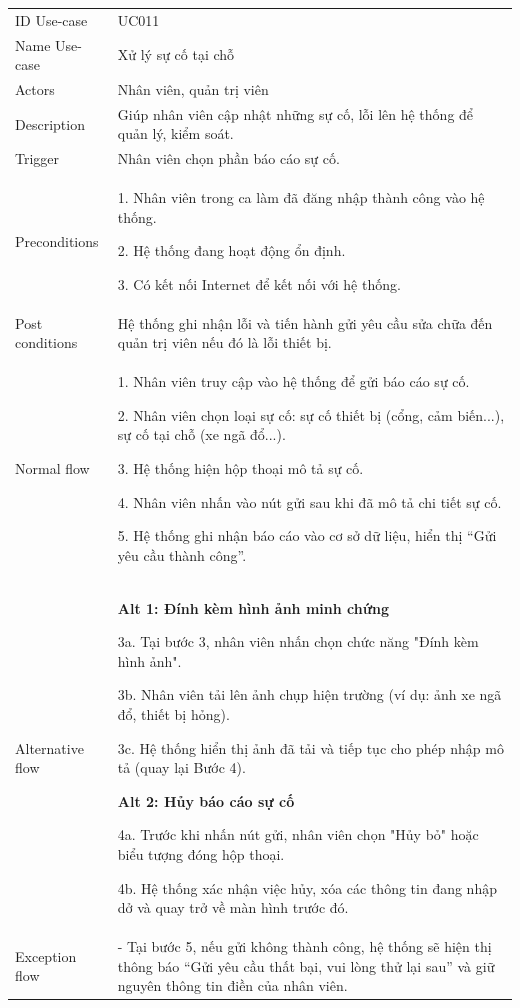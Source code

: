 \begin{center}
    \begin{tabular}{|m{2.5cm}|m{13cm}|}
    \hline
        ID Use-case  & UC011 \\ 
        Name Use-case & Xử lý sự cố tại chỗ \\ 
    \hline
        Actors & Nhân viên, quản trị viên \\
    \hline
        Description & Giúp nhân viên cập nhật những sự cố, lỗi lên hệ thống để quản lý, kiểm soát. \\
    \hline
        Trigger & Nhân viên chọn phần báo cáo sự cố. \\
    \hline
        Preconditions & 
        1. Nhân viên trong ca làm đã đăng nhập thành công vào hệ thống.
        
        2. Hệ thống đang hoạt động ổn định.
        
        3. Có kết nối Internet để kết nối với hệ thống. \\
    \hline
        Post conditions & Hệ thống ghi nhận lỗi và tiến hành gửi yêu cầu sửa chữa đến quản trị viên nếu đó là lỗi thiết bị. \\
    \hline
        Normal flow & 
        1. Nhân viên truy cập vào hệ thống để gửi báo cáo sự cố.
        
        2. Nhân viên chọn loại sự cố: sự cố thiết bị (cổng, cảm biến...), sự cố tại chỗ (xe ngã đổ...).
        
        3. Hệ thống hiện hộp thoại mô tả sự cố.
        
        4. Nhân viên nhấn vào nút gửi sau khi đã mô tả chi tiết sự cố.
        
        5. Hệ thống ghi nhận báo cáo vào cơ sở dữ liệu, hiển thị “Gửi yêu cầu thành công”. \\
    \hline
        Alternative flow & 
        \textbf{Alt 1: Đính kèm hình ảnh minh chứng}
        
        3a. Tại bước 3, nhân viên nhấn chọn chức năng "Đính kèm hình ảnh".
        
        3b. Nhân viên tải lên ảnh chụp hiện trường (ví dụ: ảnh xe ngã đổ, thiết bị hỏng).
        
        3c. Hệ thống hiển thị ảnh đã tải và tiếp tục cho phép nhập mô tả (quay lại Bước 4).
        
        \textbf{Alt 2: Hủy báo cáo sự cố}
        
        4a. Trước khi nhấn nút gửi, nhân viên chọn "Hủy bỏ" hoặc biểu tượng đóng hộp thoại.
        
        4b. Hệ thống xác nhận việc hủy, xóa các thông tin đang nhập dở và quay trở về màn hình trước đó. \\ 
    \hline
        Exception flow & 
        - Tại bước 5, nếu gửi không thành công, hệ thống sẽ hiện thị thông báo “Gửi yêu cầu thất bại, vui lòng thử lại sau” và giữ nguyên thông tin điền của nhân viên. \\ 
    \hline
    \end{tabular}
\end{center}